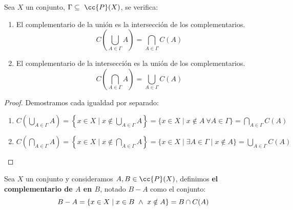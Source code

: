 \begin{prop}
    Sea $X$ un conjunto, $\Gamma \subseteq~\cc{P}(X)$, se verifica:
    \begin{enumerate}
        \item El complementario de la unión es la intersección de los complementarios.
        $$C\left( \bigcup_{A\in\Gamma}A \right) = \bigcap_{A\in\Gamma}C(A)$$

        \item El complementario de la intersección es la unión de los complementarios.
        $$C\left( \bigcap_{A\in\Gamma}A \right) = \bigcup_{A\in\Gamma}C(A)$$
    \end{enumerate}
\end{prop}
\begin{proof} Demostramos cada igualdad por separado:
\begin{enumerate}
    \item $C\left( \bigcup\limits_{A\in\Gamma}A \right) = \left\{x \in X \mid x \notin \bigcup\limits_{A\in\Gamma}A\right\} = \{x \in X \mid x \notin A ~\forall A \in \Gamma \} = \bigcap\limits_{A\in\Gamma}C(A)$

    \item $C\left( \bigcap\limits_{A\in\Gamma}A \right) = \left\{ x \in X \mid x \notin \bigcap\limits_{A\in\Gamma}A \right\} = \{x \in X \mid \exists A \in \Gamma \mid x \notin A\} = \bigcup\limits_{A\in\Gamma}C(A)$
\end{enumerate}
\end{proof}

\begin{definicion}
    Sea $X$ un conjunto y consideramos $A, B \in \cc{P}(X)$, definimos \textbf{el complementario de $A$ en $B$}, notado
    $B-A$ como el conjunto:
    $$B-A = \{x \in X \mid x \in B \ \land \  x \notin A\} = B \cap C(A)$$
\end{definicion}

